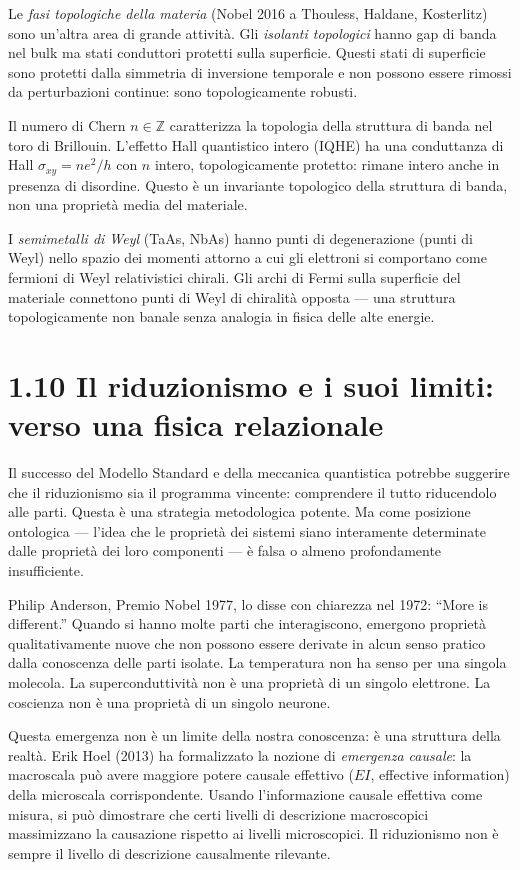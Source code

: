 \documentclass[11.5pt,a4paper,openany]{book}
\theoremstyle{remark}
\begin{document}
Le \textit{fasi topologiche della materia} (Nobel 2016 a Thouless, Haldane, Kosterlitz) sono un'altra area di grande attività. Gli \textit{isolanti topologici} hanno gap di banda nel bulk ma stati conduttori protetti sulla superficie. Questi stati di superficie sono protetti dalla simmetria di inversione temporale e non possono essere rimossi da perturbazioni continue: sono topologicamente robusti.

Il numero di Chern $n \in \mathbb{Z}$ caratterizza la topologia della struttura di banda nel toro di Brillouin. L'effetto Hall quantistico intero (IQHE) ha una conduttanza di Hall $\sigma_{xy} = ne^2/h$ con $n$ intero, topologicamente protetto: rimane intero anche in presenza di disordine. Questo è un invariante topologico della struttura di banda, non una proprietà media del materiale.

I \textit{semimetalli di Weyl} (TaAs, NbAs) hanno punti di degenerazione (punti di Weyl) nello spazio dei momenti attorno a cui gli elettroni si comportano come fermioni di Weyl relativistici chirali. Gli archi di Fermi sulla superficie del materiale connettono punti di Weyl di chiralità opposta --- una struttura topologicamente non banale senza analogia in fisica delle alte energie.

\section{1.10 Il riduzionismo e i suoi limiti: verso una fisica relazionale}

Il successo del Modello Standard e della meccanica quantistica potrebbe suggerire che il riduzionismo sia il programma vincente: comprendere il tutto riducendolo alle parti. Questa è una strategia metodologica potente. Ma come posizione ontologica --- l'idea che le proprietà dei sistemi siano interamente determinate dalle proprietà dei loro componenti --- è falsa o almeno profondamente insufficiente.

Philip Anderson, Premio Nobel 1977, lo disse con chiarezza nel 1972: ``More is different.'' Quando si hanno molte parti che interagiscono, emergono proprietà qualitativamente nuove che non possono essere derivate in alcun senso pratico dalla conoscenza delle parti isolate. La temperatura non ha senso per una singola molecola. La superconduttività non è una proprietà di un singolo elettrone. La coscienza non è una proprietà di un singolo neurone.

Questa emergenza non è un limite della nostra conoscenza: è una struttura della realtà. Erik Hoel (2013) ha formalizzato la nozione di \textit{emergenza causale}: la macroscala può avere maggiore potere causale effettivo ($EI$, effective information) della microscala corrispondente. Usando l'informazione causale effettiva come misura, si può dimostrare che certi livelli di descrizione macroscopici massimizzano la causazione rispetto ai livelli microscopici. Il riduzionismo non è sempre il livello di descrizione causalmente rilevante.
\end{document}
